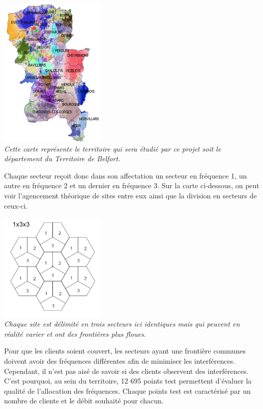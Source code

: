 \documentclass[a4paper, 11pt]{report}
\begin{document}
\begin{center}
	\includegraphics[width=5cm]{carte.png}\\
	\emph{Cette carte représente le territoire qui sera étudié par ce projet soit le département du Territoire de Belfort.\\}
\end{center}

	Chaque secteur reçoit donc dans son affectation  un secteur en fréquence 1, un autre en fréquence 2 et un dernier en fréquence 3. Sur la carte ci-dessous, on peut voir l'agencement théorique de sites entre eux ainsi que la division en secteurs de ceux-ci.
	
	\begin{center}
		\includegraphics[width=5cm]{ruche}\\
		\emph{Chaque site est délimité en trois secteurs ici identiques mais qui peuvent en réalité varier et ont des frontières plus floues.\\}
	\end{center}

Pour que les clients soient couvert, les secteurs ayant une frontière communes doivent avoir des fréquences différentes afin de minimiser les interférences.\\
Cependant, il n'est pas aisé de savoir si des clients observent des interférences. C'est pourquoi, au sein du territoire, 12 695 points test permettent d'évaluer la qualité de l'allocation des fréquences. Chaque points test est caractérisé par un nombre de clients et le débit souhaité pour chacun. 
\end{document}
